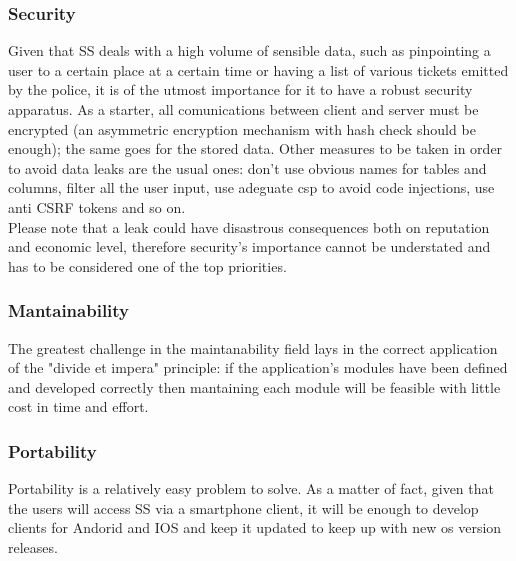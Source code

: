 	\subsubsection{Security}
	Given that SS deals with a high volume of sensible data, such as pinpointing a user to a certain place at a certain time or having a list of various tickets emitted by the police, it is of the utmost importance for it to have a robust security apparatus. As a starter, all comunications between client and server must be encrypted (an asymmetric encryption mechanism with hash check should be enough); the same goes for the stored data. Other measures to be taken in order to avoid data leaks are the usual ones: don't use obvious names for tables and columns, filter all the user input, use adeguate csp to avoid code injections, use anti CSRF tokens and so on.\\
	Please note that a leak could have disastrous consequences both on reputation and economic level, therefore security's importance cannot be understated and has to be considered one of the top priorities. 
	\subsubsection{Mantainability}
	The greatest challenge in the maintanability field lays in the correct application of the "divide et impera" principle: if the application's modules have been defined and developed correctly then mantaining each module will be feasible with little cost in time and effort.
	\subsubsection{Portability}
	Portability is a relatively easy problem to solve. As a matter of fact, given that the users will access SS via a smartphone client, it will be enough to develop clients for Andorid and IOS and keep it updated to keep up with new os version releases. 
